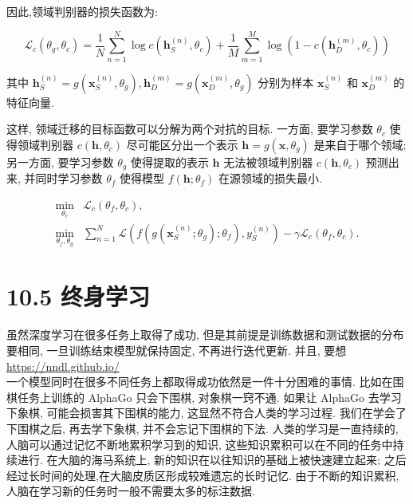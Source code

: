 \documentclass[10pt]{article}
\begin{document}
因此,领域判别器的损失函数为:


\begin{equation*}
\mathcal{L}_{c}\left(\theta_{g}, \theta_{c}\right)=\frac{1}{N} \sum_{n=1}^{N} \log c\left(\boldsymbol{h}_{S}^{(n)}, \theta_{c}\right)+\frac{1}{M} \sum_{m=1}^{M} \log \left(1-c\left(\boldsymbol{h}_{D}^{(m)}, \theta_{c}\right)\right) \tag{10.33}
\end{equation*}


其中 $\boldsymbol{h}_{S}^{(n)}=g\left(\boldsymbol{x}_{S}^{(n)}, \theta_{g}\right), \boldsymbol{h}_{D}^{(m)}=g\left(\boldsymbol{x}_{D}^{(m)}, \theta_{g}\right)$ 分别为样本 $\boldsymbol{x}_{S}^{(n)}$ 和 $\boldsymbol{x}_{D}^{(m)}$ 的特征向量.

这样, 领域迁移的目标函数可以分解为两个对抗的目标. 一方面, 要学习参数 $\theta_{c}$ 使得领域判别器 $c\left(\boldsymbol{h}, \theta_{c}\right)$ 尽可能区分出一个表示 $\boldsymbol{h}=g\left(\boldsymbol{x}, \theta_{g}\right)$ 是来自于哪个领域; 另一方面, 要学习参数 $\theta_{g}$ 使得提取的表示 $\boldsymbol{h}$ 无法被领域判别器 $c\left(\boldsymbol{h}, \theta_{c}\right)$ 预测出来, 并同时学习参数 $\theta_{f}$ 使得模型 $f\left(\boldsymbol{h} ; \theta_{f}\right)$ 在源领域的损失最小.

\[
\begin{array}{ll}
\min _{\theta_{c}} & \mathcal{L}_{c}\left(\theta_{f}, \theta_{c}\right), \\
\min _{\theta_{f}, \theta_{g}} & \sum_{n=1}^{N} \mathcal{L}\left(f\left(g\left(\boldsymbol{x}_{S}^{(n)} ; \theta_{g}\right) ; \theta_{f}\right), y_{S}^{(n)}\right)-\gamma \mathcal{L}_{c}\left(\theta_{f}, \theta_{c}\right) . \tag{10.35}
\end{array}
\]

\section*{10.5 终身学习}
虽然深度学习在很多任务上取得了成功, 但是其前提是训练数据和测试数据的分布要相同, 一旦训练结束模型就保持固定, 不再进行迭代更新. 并且, 要想 \href{https://nndl.github.io/}{https://nndl.github.io/}\\
一个模型同时在很多不同任务上都取得成功依然是一件十分困难的事情. 比如在围棋任务上训练的 AlphaGo 只会下围棋, 对象棋一窍不通. 如果让 AlphaGo 去学习下象棋, 可能会损害其下围棋的能力, 这显然不符合人类的学习过程. 我们在学会了下围棋之后, 再去学下象棋, 并不会忘记下围棋的下法. 人类的学习是一直持续的, 人脑可以通过记忆不断地累积学习到的知识, 这些知识累积可以在不同的任务中持续进行. 在大脑的海马系统上, 新的知识在以往知识的基础上被快速建立起来; 之后经过长时间的处理,在大脑皮质区形成较难遗忘的长时记忆. 由于不断的知识累积, 人脑在学习新的任务时一般不需要太多的标注数据.
\end{document}
